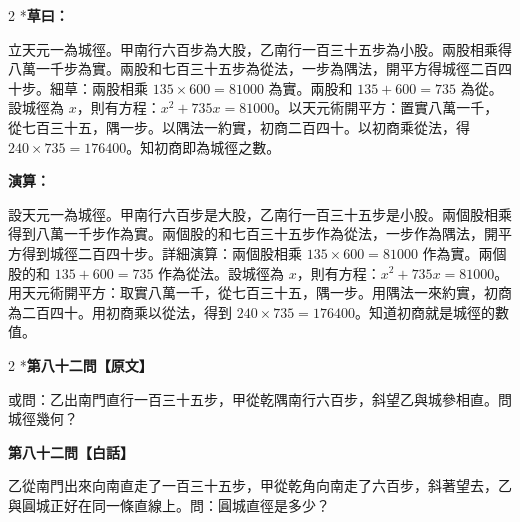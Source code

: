 \documentclass[11pt,a4paper]{article}
\begin{document}
\begin{paracol}{2}
\switchcolumn[0]*\textbf{草曰：}

\small 立天元一為城徑。甲南行六百步為大股，乙南行一百三十五步為小股。兩股相乘得八萬一千步為實。兩股和七百三十五步為從法，一步為隅法，開平方得城徑二百四十步。細草：兩股相乘 $135 \times 600 = 81000$ 為實。兩股和 $135 + 600 = 735$ 為從。設城徑為 $x$，則有方程：$x^2 + 735x = 81000$。以天元術開平方：置實八萬一千，從七百三十五，隅一步。以隅法一約實，初商二百四十。以初商乘從法，得 $240 \times 735 = 176400$。知初商即為城徑之數。

\switchcolumn\textbf{演算：}

\small 設天元一為城徑。甲南行六百步是大股，乙南行一百三十五步是小股。兩個股相乘得到八萬一千步作為實。兩個股的和七百三十五步作為從法，一步作為隅法，開平方得到城徑二百四十步。詳細演算：兩個股相乘 $135 \times 600 = 81000$ 作為實。兩個股的和 $135 + 600 = 735$ 作為從法。設城徑為 $x$，則有方程：$x^2 + 735x = 81000$。用天元術開平方：取實八萬一千，從七百三十五，隅一步。用隅法一來約實，初商為二百四十。用初商乘以從法，得到 $240 \times 735 = 176400$。知道初商就是城徑的數值。
\end{paracol}

\vspace{0.1cm}
\noindent{}
\par\vspace{0.3cm}

\begin{paracol}{2}
\switchcolumn[0]*\noindent\textbf{第八十二問【原文】}

\small 或問：乙出南門直行一百三十五步，甲從乾隅南行六百步，斜望乙與城參相直。問城徑幾何？

\switchcolumn\noindent\textbf{第八十二問【白話】}

\small 乙從南門出來向南直走了一百三十五步，甲從乾角向南走了六百步，斜著望去，乙與圓城正好在同一條直線上。問：圓城直徑是多少？
\end{paracol}

\vspace{0.1cm}
\noindent{}
\par\vspace{0.15cm}
\end{document}
